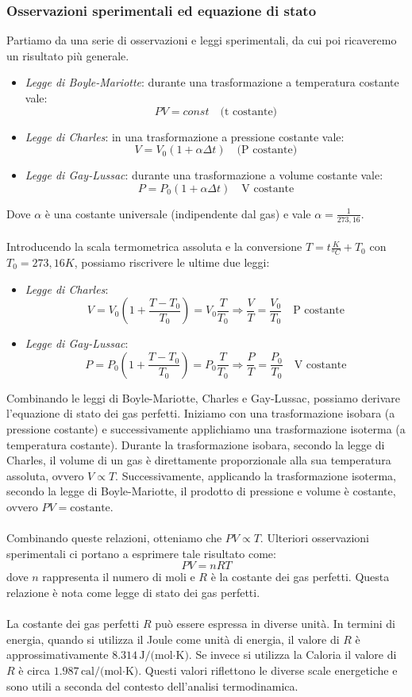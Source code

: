 \documentclass{article}
\begin{document}
\subsubsection{Osservazioni sperimentali ed equazione di stato}
Partiamo da una serie di osservazioni e leggi sperimentali, da cui poi ricaveremo un risultato più generale.
\begin{itemize}
    \item \textit{Legge di Boyle-Mariotte}: durante una trasformazione a temperatura costante vale: $$ PV = const \quad\text{(t costante)} $$
    \item \textit{Legge di Charles}: in una trasformazione a pressione costante vale:
    $$ V=V_0(1+\alpha\Delta t) \quad\text{(P costante)} $$
    \item \textit{Legge di Gay-Lussac}: durante una trasformazione a volume costante vale:
    $$ P=P_0(1+\alpha\Delta t)\quad \text{V costante} $$    
\end{itemize}
Dove $\alpha$ è una costante universale (indipendente dal gas) e vale $\alpha = \frac{1}{273,16}$.\\\\
Introducendo la scala termometrica assoluta e la conversione $T=t\frac{K}{^oC}+T_0$ con $T_0=273,16K$, possiamo riscrivere le ultime due leggi:
\begin{itemize}
    \item \textit{Legge di Charles}:
    $$ V=V_0(1+\frac{T-T_0}{T_0})=V_0\frac{T}{T_0} \Rightarrow \frac{V}{T}=\frac{V_0}{T_0}\quad\text{P costante}$$

    \item \textit{Legge di Gay-Lussac}:
    $$ P=P_0(1+\frac{T-T_0}{T_0})=P_0\frac{T}{T_0}\Rightarrow\frac{P}{T}=\frac{P_0}{T_0}\quad\text{V costante} $$
\end{itemize}
Combinando le leggi di Boyle-Mariotte, Charles e Gay-Lussac, possiamo derivare l'equazione di stato dei gas perfetti. Iniziamo con una trasformazione isobara (a pressione costante) e successivamente applichiamo una trasformazione isoterma (a temperatura costante). Durante la trasformazione isobara, secondo la legge di Charles, il volume di un gas è direttamente proporzionale alla sua temperatura assoluta, ovvero $ V \propto T $. Successivamente, applicando la trasformazione isoterma, secondo la legge di Boyle-Mariotte, il prodotto di pressione e volume è costante, ovvero $ PV = \text{costante} $.\\\\
Combinando queste relazioni, otteniamo che $ PV \propto T $. Ulteriori osservazioni sperimentali ci portano a esprimere tale risultato come:
$$PV=nRT$$
dove $n$ rappresenta il numero di moli e $R$ è la costante dei gas perfetti. Questa relazione è nota come legge di stato dei gas perfetti.\\\\
La costante dei gas perfetti $ R $ può essere espressa in diverse unità. In termini di energia, quando si utilizza il Joule come unità di energia, il valore di $ R $ è approssimativamente $ 8.314 \, \text{J/(mol·K)} $. Se invece si utilizza la Caloria il valore di $ R $ è circa $ 1.987 \, \text{cal/(mol·K)} $. Questi valori riflettono le diverse scale energetiche e sono utili a seconda del contesto dell'analisi termodinamica.
\end{document}
